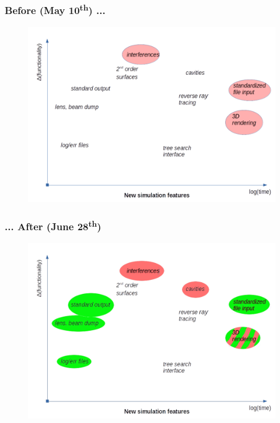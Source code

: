\documentclass{beamer}
\begin{document}
\begin{frame}
\frametitle{Before (May 10\textsuperscript{th}) ...}
\begin{figure}
\begin{center}
\includegraphics[scale=0.36]{newfeatures.pdf}
\end{center}
\end{figure}
\end{frame}

\begin{frame}
\frametitle{... After (June 28\textsuperscript{th})}
\begin{figure}
\begin{center}
\includegraphics[scale=0.36]{newfeatures2.pdf}
\end{center}
\end{figure}
\end{frame}
\end{document}
